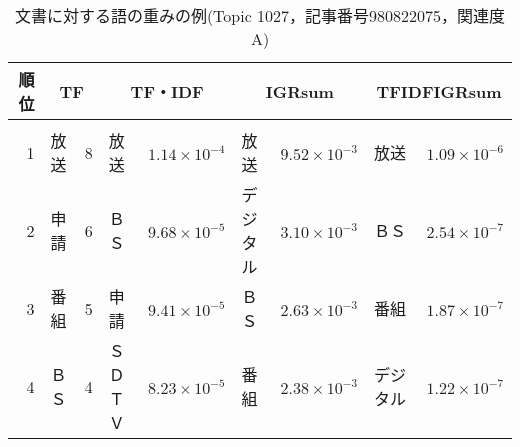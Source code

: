 \begin{table}[htbp]
\caption{文書に対する語の重みの例(Topic 1027，記事番号980822075，関連度A)}
\label{Table:weight1027A}
\footnotesize
\begin{center}
\begin{tabular}{|r|ll|ll|ll|ll|}
  \hline
  \hspace{-1mm}順位\hspace{-1mm}	  & \multicolumn{2}{c|}{TF}& \multicolumn{2}{c|}{TF・IDF} & \multicolumn{2}{c|}{IGRsum} & \multicolumn{2}{c|}{TFIDFIGRsum}\\
  \hline 
& & & & & & & & \\[-8pt]
  1	  & 放送     & \hspace{-2mm}8\hspace{-1.0mm}	  & 放送       & \hspace{-2mm}$1.14\times 10^{-4}$\hspace{-1.5mm} & 放送         & \hspace{-2mm}$9.52\times 10^{-3}$\hspace{-1.5mm} & 放送         & \hspace{-2mm}$1.09\times 10^{-6}$\hspace{-1.5mm} \\
  2	  & 申請     & \hspace{-2mm}6\hspace{-1.0mm}	  & ＢＳ       & \hspace{-2mm}$9.68\times 10^{-5}$\hspace{-1.5mm} & デジタル     & \hspace{-2mm}$3.10\times 10^{-3}$\hspace{-1.5mm} & ＢＳ         & \hspace{-2mm}$2.54\times 10^{-7}$\hspace{-1.5mm} \\
  3	  & 番組     & \hspace{-2mm}5\hspace{-1.0mm}	  & 申請       & \hspace{-2mm}$9.41\times 10^{-5}$\hspace{-1.5mm} & ＢＳ         & \hspace{-2mm}$2.63\times 10^{-3}$\hspace{-1.5mm} & 番組         & \hspace{-2mm}$1.87\times 10^{-7}$\hspace{-1.5mm} \\
  4	  & ＢＳ     & \hspace{-2mm}4\hspace{-1.0mm}	  & ＳＤＴＶ   & \hspace{-2mm}$8.23\times 10^{-5}$\hspace{-1.5mm} & 番組         & \hspace{-2mm}$2.38\times 10^{-3}$\hspace{-1.5mm} & デジタル    & \hspace{-2mm}$1.22\times 10^{-7}$\hspace{-1.5mm} \\

\end{tabular}
\end{center}
\end{table}
